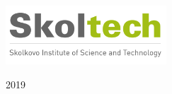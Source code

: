 \documentclass[a4paper, 11pt, oneside]{Thesis}  %
\begin{document}


\appendix 

 







\backmatter

\label{Bibliography}


\begin{titlepage}
 \begin{center}
 \phantom{a}\vspace{13.2cm}
 
\includegraphics[width=6cm]{sk.png}
  
 
  \vspace{7cm}
  
  2019

  \vspace{2cm}

  
  
  
 \end{center}

\end{titlepage}
\end{document}
